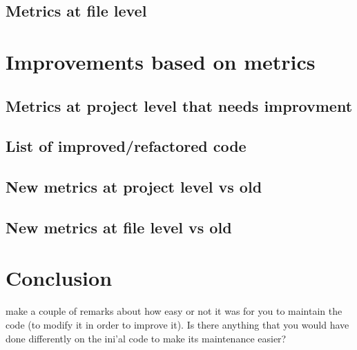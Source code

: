 \documentclass{article}
\begin{document}
\subsection{Metrics at file level}

\section{Improvements based on metrics}

\subsection{Metrics at project level that needs improvment}

\subsection{List of improved/refactored code}

\subsection{New metrics at project level vs old}

\subsection{New metrics at file level vs old}

\section{Conclusion}
make a couple of remarks about how easy or not it was for you to maintain the code
(to modify it in order to improve it). Is there anything that you would have done differently on
the ini'al code to make its maintenance easier?
\end{document}
